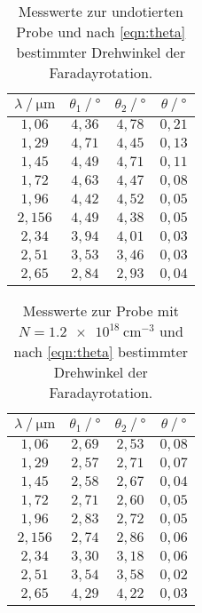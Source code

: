 \begin{table}
              \centering
              \caption{Messwerte zur undotierten Probe und nach \autoref{eqn:theta} bestimmter Drehwinkel der Faradayrotation.}
              \label{tab:mw1}
              \begin{tabular}{c c c c}
                \toprule
                $\lambda \mathbin{/} \unit{\micro\meter}$ & $\theta_{1} \mathbin{/} \unit{\degree}$ & $\theta_{2} \mathbin{/} \unit{\degree}$ &%
                 $\theta \mathbin{/} \unit{\degree}$ \\
                \midrule
                $1,06 $ & $4,36$ & $4,78$ & $0,21$ \\
                $1,29 $ & $4,71$ & $4,45$ & $0,13$ \\
                $1,45 $ & $4,49$ & $4,71$ & $0,11$ \\
                $1,72 $ & $4,63$ & $4,47$ & $0,08$ \\
                $1,96 $ & $4,42$ & $4,52$ & $0,05$ \\
                $2,156$ & $4,49$ & $4,38$ & $0,05$ \\
                $2,34 $ & $3,94$ & $4,01$ & $0,03$ \\
                $2,51 $ & $3,53$ & $3,46$ & $0,03$ \\
                $2,65 $ & $2,84$ & $2,93$ & $0,04$ \\
                \bottomrule
              \end{tabular}
\end{table}

\begin{table}
              \centering
              \caption{Messwerte zur Probe mit $N = \qty{1.2e18}{\centi\metre^{-3}}$ und nach \autoref{eqn:theta} bestimmter Drehwinkel der Faradayrotation.}
              \label{tab:mw2}
              \begin{tabular}{c c c c}
                \toprule
                $\lambda \mathbin{/} \unit{\micro\meter}$ & $\theta_{1} \mathbin{/} \unit{\degree}$ & $\theta_{2} \mathbin{/} \unit{\degree}$ &%
                 $\theta \mathbin{/} \unit{\degree}$ \\
                \midrule
                $1,06 $ & $2,69$ & $2,53$ & $0,08$ \\
                $1,29 $ & $2,57$ & $2,71$ & $0,07$ \\
                $1,45 $ & $2,58$ & $2,67$ & $0,04$ \\
                $1,72 $ & $2,71$ & $2,60$ & $0,05$ \\
                $1,96 $ & $2,83$ & $2,72$ & $0,05$ \\
                $2,156$ & $2,74$ & $2,86$ & $0,06$ \\
                $2,34 $ & $3,30$ & $3,18$ & $0,06$ \\
                $2,51 $ & $3,54$ & $3,58$ & $0,02$ \\
                $2,65 $ & $4,29$ & $4,22$ & $0,03$ \\
                \bottomrule
              \end{tabular}
\end{table}

